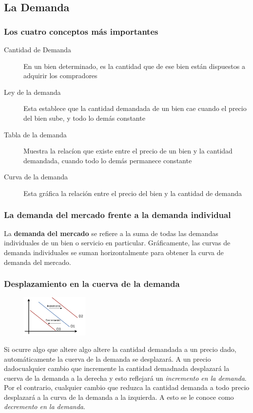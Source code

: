 \subsection{La Demanda}
\subsubsection{Los cuatro conceptos más importantes}
\begin{description}
\item[Cantidad de Demanda] En un bien determinado, es la cantidad que de ese bien están dispuestos a adquirir los compradores
\item[Ley de la demanda] Esta establece que la cantidad demandada de un bien cae cuando el precio del bien sube, y todo lo demás constante 
\item[Tabla de la demanda] Muestra la relacíon que existe entre el precio de un bien y la cantidad demandada, cuando todo lo demás permanece constante
\item[Curva de la demanda] Esta gráfica la relación entre el precio del bien y la cantidad de demanda  
\end{description}

\subsubsection{La demanda del mercado frente a la demanda individual}
La {\bf demanda del mercado} se refiere a la suma de todas las demandas individuales de un bien o servicio en particular. Gráficamente, las curvas de demanda individuales se suman horizontalmente para obtener la curva de demanda del mercado.

\subsubsection{Desplazamiento en la cuerva de la demanda}
\begin{figure} %
    \centering
    \includegraphics[width=0.3\textwidth]{images/demand1.png}
\end{figure}

Si ocurre algo que altere algo altere la cantidad demandada a un precio dado, automáticamente la cuerva de la demanda se desplazará. A un precio dadocualquier cambio que incremente la cantidad demadnada desplazará la cuerva de la demanda a la derecha y esto reflejará un \textit{incremento en la demanda}. Por el contrario, cualquier cambio que reduzca la cantidad demanda a todo precio desplazará a la curva de la demanda a la izquierda. A esto se le conoce como \textit{decremento en la demanda}.\\

